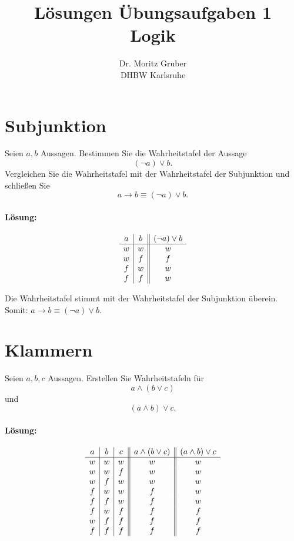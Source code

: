 \documentclass[
				a4paper,
				10pt
			]
			{scrartcl}
\author{Dr. Moritz Gruber\\ DHBW Karlsruhe}
\title{L\"osungen \"Ubungsaufgaben 1\\
	Logik
}
\date{}
\begin{document}
\maketitle


\section{Subjunktion}
Seien $a,b$  Aussagen. 
Bestimmen Sie die Wahrheitstafel der Aussage
$$
	(\neg a) \lor b.
$$
Vergleichen Sie die Wahrheitstafel mit der Wahrheitstafel der Subjunktion und schlie{\ss}en Sie
$$
	a \rightarrow b \equiv (\neg a) \lor b.
$$

\paragraph{L\"osung:}

$$
	\begin{array}{c | c || c}
		a	&b	& (\neg a) \lor b	\\ \hline
		w	&w	& w			\\
		w	&f	& f			\\
		f	&w	& w			\\
		f	&f	& w	
	\end{array}
$$

Die Wahrheitstafel stimmt mit der Wahrheitstafel der Subjunktion \"uberein. Somit: $a \rightarrow b \equiv (\neg a) \lor b$.

\newpage
\section{Klammern}
Seien $a,b,c$  Aussagen.
Erstellen Sie Wahrheitstafeln f\"ur 
$$
	a\land (b \lor c)
$$
und
$$
	(a\land b) \lor c.
$$

\paragraph{L\"osung:}

$$
	\begin{array}{c | c | c || c || c}
		a	&b	&c	& a\land (b \lor c)	& (a\land b) \lor c	\\ \hline
		w	&w	&w	& w				& w				\\
		w	&w	&f	& w				& w				\\
		w	&f	&w	& w				& w				\\
		f	&w	&w	& f				& w				\\
		f	&f	&w	& f				& w				\\
		f	&w	&f	& f				& f				\\
		w	&f	&f	& f				& f				\\
		f	&f	&f	& f				& f				\\
	\end{array}
$$
\end{document}
